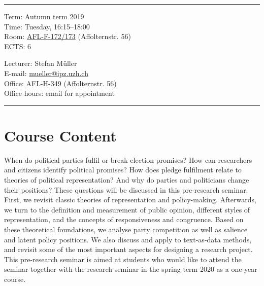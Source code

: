 \documentclass[abstract=on,parskip=full,headings=standardclasses,fontsize=11pt,paper=a4]{scrartcl}
\begin{document}
\hrule
\medskip
\begin{minipage}[t]{0.5\textwidth}
Term: Autumn term 2019 \\
Time: Tuesday, 16:15--18:00 \\
Room:  \href{https://www.plaene.uzh.ch/AFL}{AFL-F-172/173} (Affolternstr. 56) \\
ECTS: 6
\end{minipage}
\begin{minipage}[t]{0.49\textwidth}
\begin{flushright}
Lecturer: Stefan Müller \\
E-mail: \href{mailto:mueller@ipz.uzh.ch}{\textsf{mueller@ipz.uzh.ch}} \\
Office:  AFL-H-349 (Affolternstr. 56) \\
Office hours: email for appointment \\
\end{flushright}
\end{minipage}
\medskip
\vspace{2.5mm}
\hrule 

\section*{Course Content}

When do political parties fulfil or break election promises? How can researchers and citizens identify political promises? How does pledge fulfilment relate to theories of political representation? And why do parties and politicians change their positions? 
These questions will be discussed in this pre-research seminar. First, we revisit classic theories of representation and policy-making. Afterwards, we turn to the definition and measurement of public opinion, different styles of representation, and the concepts of responsiveness and congruence. Based on  these theoretical foundations, we analyse party competition as well as salience and latent policy positions.  We  also  discuss and apply to text-as-data methods, and revisit some of the most important aspects for designing a research project. This pre-research seminar is aimed at students who would like to attend the seminar together with the research seminar in the spring term 2020 as a one-year course.

\end{document}
